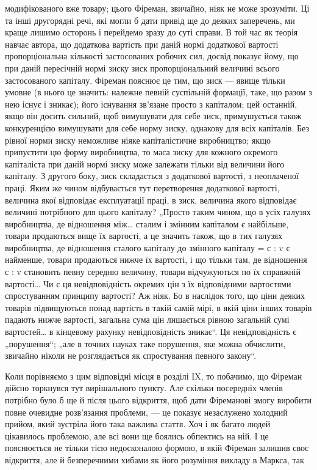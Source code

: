 \parcont{}  %
модифікованого вже товару; цього Фіреман, звичайно, ніяк не
може зрозуміти. Ці та інші другорядні речі, які могли б дати
привід ще до деяких заперечень, ми краще лишимо осторонь
і перейдемо зразу до суті справи. В той час як теорія навчає
автора, що додаткова вартість при даній нормі додаткової вартості
пропорціональна кількості застосованих робочих сил, досвід
показує йому, що при даній пересічній нормі зиску зиск
пропорціональний величині всього застосованого капіталу. Фіреман
пояснює це тим, що зиск — явище тільки умовне (в нього
це значить: належне певній суспільній формації, таке, що разом
з нею існує і зникає); його існування зв’язане просто з капіталом;
цей останній, якщо він досить сильний, щоб вимушувати
для себе зиск, примушується також конкуренцією вимушувати
для себе норму зиску, однакову для всіх капіталів. Без рівної
норми зиску неможливе ніяке капіталістичне виробництво; якщо
припустити цю форму виробництва, то маса зиску для кожного
окремого капіталіста при даній нормі зиску може залежати тільки
від величини його капіталу. З другого боку, зиск складається
з додаткової вартості, з неоплаченої праці. Яким же чином відбувається
тут перетворення додаткової вартості, величина якої
відповідає експлуатації праці, в зиск, величина якого відповідає
величині потрібного для цього капіталу? „Просто таким чином,
що в усіх галузях виробництва, де відношення між\dots{} сталим
і змінним капіталом є найбільше, товари продаються вище їх
вартості, а це значить також, що в тих галузях виробництва,
де відношення сталого капіталу до змінного капіталу = с : v є
найменше, товари продаються нижче їх вартості, і що тільки
там, де відношення с : v становить певну середню величину,
товари відчужуються по їх справжній вартості\dots{} Чи є ця невідповідність
окремих цін з їх відповідними вартостями спростуванням
принципу вартості? Аж ніяк. Бо в наслідок того, що
ціни деяких товарів підвищуються понад вартість в такій самій
мірі, в якій ціни інших товарів падають нижче вартості, загальна
сума цін лишається рівною загальній сумі вартостей\dots{}
в кінцевому рахунку невідповідність зникає“. Ця невідповідність
є „порушення“; „але в точних науках таке порушення, яке можна
обчислити, звичайно ніколи не розглядається як спростування
певного закону“.

Коли порівняємо з цим відповідні місця в розділі IX, то побачимо,
що Фіреман дійсно торкнувся тут вирішального пункту.
Але скільки посередніх членів потрібно було б ще й після цього
відкриття, щоб дати Фіреманові змогу виробити повне очевидне
розв’язання проблеми, — це показує незаслужено холодний
прийом, який зустріла його така важлива стаття. Хоч і як багато
людей цікавилось проблемою, але всі вони ще боялись обпектись
на ній. І це пояснюється не тільки тією недосконалою
формою, в якій Фіреман залишив своє відкриття, але й безперечними
хибами як його розуміння викладу в Маркса, так
\parbreak{}  %
